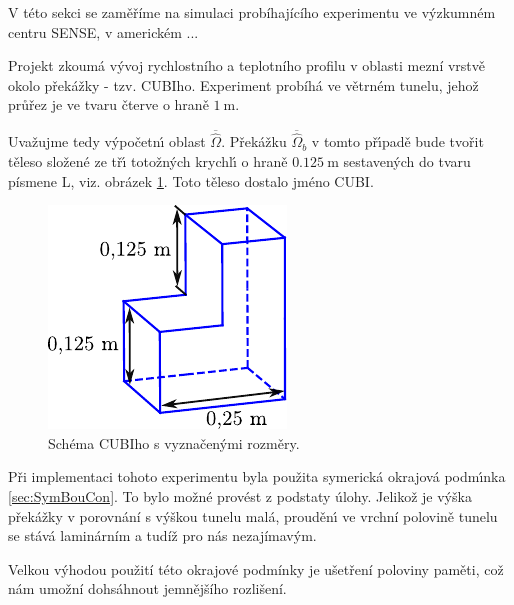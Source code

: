         V t\'{e}to sekci se zam\v{e}\v{r}\'{i}me na simulaci prob\'{i}haj\'{i}c\'{i}ho experimentu ve v\'{y}zkumn\'{e}m centru SENSE, v americk\'{e}m ...
        
        Projekt zkoum\'{a} v\'{y}voj rychlostn\'{i}ho a teplotn\'{i}ho profilu v oblasti mezn\'{i} vrstv\v{e} okolo p\v{r}ek\'{a}\v{z}ky - tzv. CUBIho. Experiment prob\'{i}h\'{a} ve v\v{e}trn\'{e}m tunelu, jeho\v{z} pr\r{u}\v{r}ez je ve tvaru \v{c}terve o hran\v{e} $1 \ \mathrm{m}$.
        
        Uva\v{z}ujme tedy v\'{y}po\v{c}etn\'{\i} oblast $\overline{\hat{\Omega}}$. P\v{r}ek\'{a}\v{z}ku $\overline{\hat{\Omega}}_b$ v tomto p\v{r}\'{\i}pad\v{e} bude tvo\v{r}it t\v{e}leso slo\v{z}en\'{e} ze t\v{r}\'{\i} toto\v{z}n\'{y}ch krychl\'{\i} o hran\v{e} $0.125 \ \mathrm{m}$ sestaven\'{y}ch do tvaru p\'{i}smene L, viz. obr\'{a}zek \ref{fig:CUBI}. Toto t\v{e}leso dostalo jm\'{e}no CUBI.

        \begin{figure}[H]
            \centering
            \includegraphics{Img/Kapitola4/CUBI.pdf}
            \caption{Sch\'{e}ma CUBIho s vyzna\v{c}en\'{y}mi rozm\v{e}ry.}
            \label{fig:CUBI}
        \end{figure}

        P\v{r}i implementaci tohoto experimentu byla pou\v{z}ita symerick\'{a} okrajov\'{a} podm\'{\i}nka \ref{sec:SymBouCon}. To bylo mo\v{z}n\'{e} prov\'{e}st z podstaty \'{u}lohy. Jeliko\v{z} je v\'{y}\v{s}ka p\v{r}ek\'{a}\v{z}ky v porovn\'{a}n\'{i} s v\'{y}\v{s}kou tunelu mal\'{a}, proud\v{e}n\'{\i} ve vrchn\'{i} polovin\v{e} tunelu se st\'{a}v\'{a} lamin\'{a}rn\'{i}m a tud\'{i}\v{z} pro n\'{a}s nezaj\'{i}mav\'{y}m.

        Velkou v\'{y}hodou pou\v{z}it\'{i} t\'{e}to okrajov\'{e} podm\'{i}nky je u\v{s}et\v{r}en\'{i} poloviny pam\v{e}ti, co\v{z} n\'{a}m umo\v{z}n\'{i} dohs\'{a}hnout jemn\v{e}j\v{s}\'{i}ho rozli\v{s}en\'{i}. 


